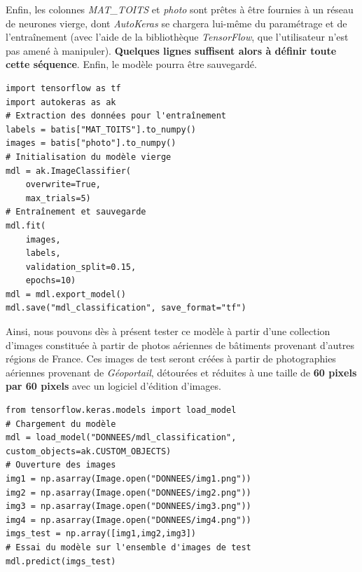 \documentclass[
  11pt,
  french,
]{article}
\begin{document}
Enfin, les colonnes \emph{MAT\_TOITS} et \emph{photo} sont prêtes à être
fournies à un réseau de neurones vierge, dont \emph{AutoKeras} se
chargera lui-même du paramétrage et de l'entraînement (avec l'aide de la
bibliothèque \emph{TensorFlow}, que l'utilisateur n'est pas amené à
manipuler). \textbf{Quelques lignes suffisent alors à définir toute
cette séquence}. Enfin, le modèle pourra être sauvegardé.

\begin{tcolorbox}[title= Entraînement du modèle de classification ,colback=boitecode]
\begin{lstlisting}[style=code]
import tensorflow as tf
import autokeras as ak
# Extraction des données pour l'entraînement
labels = batis["MAT_TOITS"].to_numpy()
images = batis["photo"].to_numpy()
# Initialisation du modèle vierge
mdl = ak.ImageClassifier(
    overwrite=True,
    max_trials=5)
# Entraînement et sauvegarde
mdl.fit(
    images,
    labels,
    validation_split=0.15,
    epochs=10)
mdl = mdl.export_model()
mdl.save("mdl_classification", save_format="tf")\end{lstlisting}
\end{tcolorbox}

Ainsi, nous pouvons dès à présent tester ce modèle à partir d'une
collection d'images constituée à partir de photos aériennes de bâtiments
provenant d'autres régions de France. Ces images de test seront créées à
partir de photographies aériennes provenant de \emph{Géoportail},
détourées et réduites à une taille de \textbf{60 pixels par 60 pixels}
avec un logiciel d'édition d'images.

\begin{tcolorbox}[title= Essai du modèle de classification ,colback=boitecode]
\begin{lstlisting}[style=code]
from tensorflow.keras.models import load_model
# Chargement du modèle 
mdl = load_model("DONNEES/mdl_classification", custom_objects=ak.CUSTOM_OBJECTS)
# Ouverture des images
img1 = np.asarray(Image.open("DONNEES/img1.png"))
img2 = np.asarray(Image.open("DONNEES/img2.png"))
img3 = np.asarray(Image.open("DONNEES/img3.png"))
img4 = np.asarray(Image.open("DONNEES/img4.png"))
imgs_test = np.array([img1,img2,img3])
# Essai du modèle sur l'ensemble d'images de test
mdl.predict(imgs_test)\end{lstlisting}
\end{tcolorbox}
\end{document}
